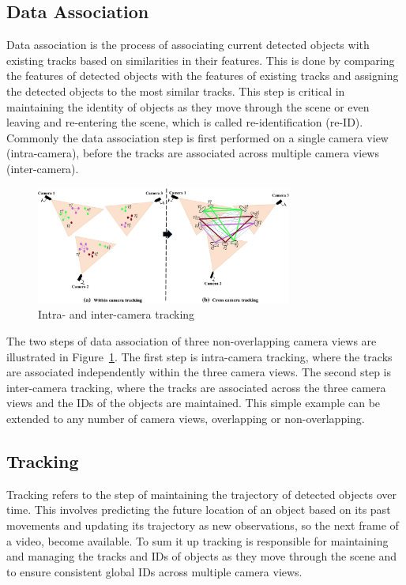 \subsection{Data Association}\label{subsec:data_association}
Data association is the process of associating current detected objects with existing tracks based on similarities in their features. This is done by comparing the features of detected objects with the features of existing tracks and assigning the detected objects to the most similar tracks. This step is critical in maintaining the identity of objects as they move through the scene or even leaving and re-entering the scene, which is called re-identification (re-ID). Commonly the data association step is first performed on a single camera view (intra-camera), before the tracks are associated across multiple camera views (inter-camera).

\begin{figure}[ht]
    \centering
    \includegraphics[width=0.75\textwidth]{resources/fig/Tesfaye19-intra_inter_camera_tracking.png}
    \caption{Intra- and inter-camera tracking~\cite[Fig.~1]{Tesfaye19}}\label{fig:intra_inter_camera_tracking}
\end{figure}

The two steps of data association of three non-overlapping camera views are illustrated in Figure~\ref{fig:intra_inter_camera_tracking}. The first step is intra-camera tracking, where the tracks are associated independently within the three camera views. The second step is inter-camera tracking, where the tracks are associated across the three camera views and the IDs of the objects are maintained. This simple example can be extended to any number of camera views, overlapping or non-overlapping.

\subsection{Tracking}\label{subsec:tracking}
Tracking refers to the step of maintaining the trajectory of detected objects over time. This involves predicting the future location of an object based on its past movements and updating its trajectory as new observations, so the next frame of a video, become available. To sum it up tracking is responsible for maintaining and managing the tracks and IDs of objects as they move through the scene and to ensure consistent global IDs across multiple camera views.

